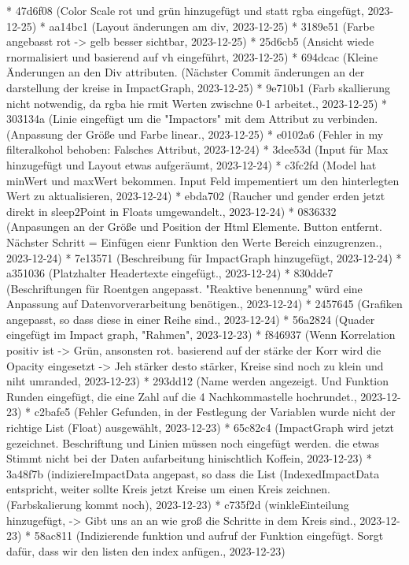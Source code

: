 \documentclass[usegeometry=true]{scrartcl}
\begin{document}
* 47d6f08 (Color Scale rot und grün hinzugefügt und statt rgba eingefügt, 2023-12-25)
* aa14bc1 (Layout änderungen am div, 2023-12-25)
* 3189e51 (Farbe angebasst rot -> gelb besser sichtbar, 2023-12-25)
* 25d6cb5 (Ansicht wiede rnormalisiert und basierend auf vh eingeführt, 2023-12-25)
* 694dcac (Kleine Änderungen an den Div attributen. (Nächster Commit änderungen an der darstellung der kreise in ImpactGraph, 2023-12-25)
* 9e710b1 (Farb skallierung nicht notwendig, da rgba hie rmit Werten zwischne 0-1 arbeitet., 2023-12-25)
* 303134a (Linie eingefügt um die "Impactors" mit dem Attribut zu verbinden. (Anpassung der Größe und Farbe linear., 2023-12-25)
* e0102a6 (Fehler in my filteralkohol behoben: Falsches Attribut, 2023-12-24)
* 3dee53d (Input für Max hinzugefügt und Layout  etwas aufgeräumt, 2023-12-24)
* c3fc2fd (Model hat minWert und maxWert bekommen. Input Feld impementiert um den hinterlegten Wert zu aktualisieren, 2023-12-24)
* ebda702 (Raucher und gender erden jetzt direkt in sleep2Point in Floats umgewandelt., 2023-12-24)
* 0836332 (Anpasungen an der Größe und Position der Html Elemente. Button entfernt. Nächster Schritt = Einfügen eienr Funktion den Werte Bereich einzugrenzen., 2023-12-24)
* 7e13571 (Beschreibung für ImpactGraph hinzugefügt, 2023-12-24)
* a351036 (Platzhalter Headertexte eingefügt., 2023-12-24)
* 830dde7 (Beschriftungen für Roentgen angepasst. "Reaktive benennung" würd eine Anpassung auf Datenvorverarbeitung benötigen., 2023-12-24)
* 2457645 (Grafiken angepasst, so dass diese in einer Reihe sind., 2023-12-24)
* 56a2824 (Quader eingefügt im Impact graph, "Rahmen", 2023-12-23)
* f846937 (Wenn Korrelation positiv ist -> Grün, ansonsten rot. basierend auf der stärke der Korr wird die Opacity eingesetzt -> Jeh stärker desto stärker, Kreise sind noch zu klein und niht umranded, 2023-12-23)
* 293dd12 (Name werden angezeigt. Und Funktion Runden eingefügt, die eine Zahl auf die 4 Nachkommastelle hochrundet., 2023-12-23)
* c2bafe5 (Fehler Gefunden, in der Festlegung der Variablen wurde nicht der richtige List (Float) ausgewählt, 2023-12-23)
* 65c82c4 (ImpactGraph wird jetzt gezeichnet. Beschriftung und Linien müssen noch eingefügt werden. die etwas Stimmt nicht bei der Daten aufarbeitung  hinischtlich Koffein, 2023-12-23)
* 3a48f7b (indiziereImpactData angepast, so dass die List (IndexedImpactData entspricht, weiter sollte Kreis jetzt Kreise um einen Kreis zeichnen. (Farbskalierung kommt noch), 2023-12-23)
* c735f2d (winkleEinteilung hinzugefügt, -> Gibt uns an an wie groß die Schritte in dem Kreis sind., 2023-12-23)
* 58ac811 (Indizierende funktion und aufruf der Funktion eingefügt. Sorgt dafür, dass wir den listen den index anfügen., 2023-12-23)
\end{document}
